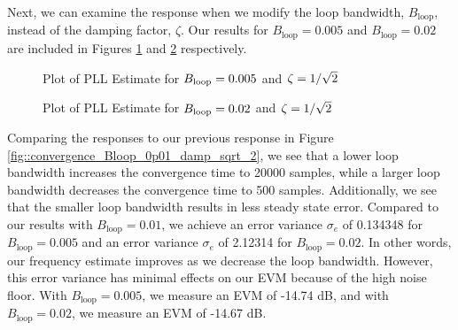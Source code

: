 \documentclass{article}
\begin{document}
Next, we can examine the response when we modify the loop bandwidth, $B_\text{loop}$, instead of the damping factor, $\zeta$. Our results for $B_\text{loop} = 0.005$ and $B_\text{loop} = 0.02$ are included in Figures \ref{fig::convergence_Bloop_0p005_damp_sqrt_2} and \ref{fig::convergence_Bloop_0p02_damp_sqrt_2} respectively.

\begin{figure}[H]
	\centerline{}
	\caption{Plot of PLL Estimate for $\protect{B_\text{loop}} = 0.005$ and $\protect{\zeta = 1/\sqrt{2}}$}
	\label{fig::convergence_Bloop_0p005_damp_sqrt_2}
\end{figure}

\begin{figure}[H]
	\centerline{}
	\caption{Plot of PLL Estimate for $\protect{B_\text{loop}} = 0.02$ and $\protect{\zeta = 1/\sqrt{2}}$}
	\label{fig::convergence_Bloop_0p02_damp_sqrt_2}
\end{figure}

\noindent Comparing the responses to our previous response in Figure \ref{fig::convergence_Bloop_0p01_damp_sqrt_2}, we see that a lower loop bandwidth increases the convergence time to 20000 samples, while a larger loop bandwidth decreases the convergence time to 500 samples. Additionally, we see that the smaller loop bandwidth results in less steady state error. Compared to our results with $B_{\text{loop}} = 0.01$, we achieve an error variance $\sigma_e$ of 0.134348 for $B_{\text{loop}} = 0.005$ and an error variance $\sigma_e$ of 2.12314 for $B_{\text{loop}} = 0.02$. In other words, our frequency estimate improves as we decrease the loop bandwidth. However, this error variance has minimal effects on our EVM because of the high noise floor. With $B_{\text{loop}} = 0.005$, we measure an EVM of -14.74 dB, and with $B_{\text{loop}} = 0.02$, we measure an EVM of -14.67 dB. 
\end{document}
